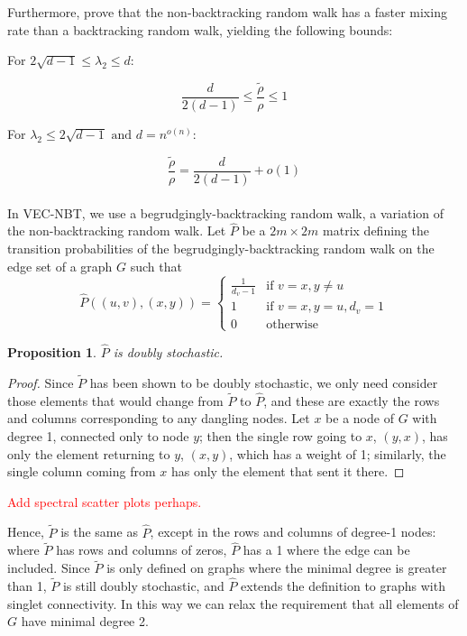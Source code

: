 \documentclass{article} %
\newtheorem{prop}{Proposition}
\begin{document}
Furthermore, \cite{NBT-Ihara, Alon} prove that the non-backtracking random walk has a faster mixing rate than a backtracking random walk, yielding the following bounds:

\begin{flushleft}
For $2\sqrt{d-1} \leq \lambda_2 \leq d:$
\end{flushleft}
$$\frac{d}{2(d-1)} \leq \frac{\tilde \rho}{\rho} \leq 1$$

\begin{flushleft}
For $\lambda_2 \leq 2\sqrt{d-1} \text{ and } d = n^{o(n)}:$
\end{flushleft}
$$\frac{\tilde \rho}{\rho} = \frac{d}{2(d-1)} + o(1)$$\\

In VEC-NBT, we use a begrudgingly-backtracking random walk, a variation of the non-backtracking random walk. Let $\hat P$ be a $2m \times 2m$ matrix defining the transition probabilities of the begrudgingly-backtracking random walk on the edge set of a graph $G$ such that
\[\hat P((u,v), (x,y)) = 
    \begin{cases} 
        \displaystyle\frac{1}{d_v-1} & \text{if } v = x, y \neq u\\
        1 & \text{if } v = x, y = u, d_v = 1 \\
        0 & \text{otherwise}
    \end{cases}
\]

\begin{prop}
$\hat P$ is doubly stochastic.
\end{prop}

\begin{proof}
Since $\tilde P$ has been shown to be doubly stochastic, we only need consider those elements that would change from $\tilde P$ to $\hat P$, and these are exactly the rows and columns corresponding to any dangling nodes. Let $x$ be a node of $G$ with degree 1, connected only to node $y$; then the single row going to $x$, $(y,x)$, has only the element returning to $y$, $(x,y)$, which has a weight of 1; similarly, the single column coming from $x$ has only the element that sent it there. 
\end{proof}

\textcolor{red}{Add spectral scatter plots perhaps.}

Hence, $\tilde P$ is the same as $\hat P$, except in the rows and columns of degree-1 nodes: where $\tilde P$ has rows and columns of zeros, $\hat P$ has a 1 where the edge can be included. Since $\tilde P$ is only defined on graphs where the minimal degree is greater than 1, $\tilde P$ is still doubly stochastic, and $\hat P$ extends the definition to graphs with singlet connectivity. In this way we can relax the requirement that all elements of $G$ have minimal degree 2.
\end{document}
